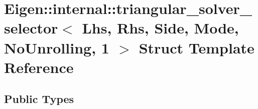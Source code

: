 \hypertarget{struct_eigen_1_1internal_1_1triangular__solver__selector_3_01_lhs_00_01_rhs_00_01_side_00_01_modf7016aec58372d55e43776676d69f5fb}{}\section{Eigen\+::internal\+::triangular\+\_\+solver\+\_\+selector$<$ Lhs, Rhs, Side, Mode, No\+Unrolling, 1 $>$ Struct Template Reference}
\label{struct_eigen_1_1internal_1_1triangular__solver__selector_3_01_lhs_00_01_rhs_00_01_side_00_01_modf7016aec58372d55e43776676d69f5fb}
\subsection*{Public Types}
